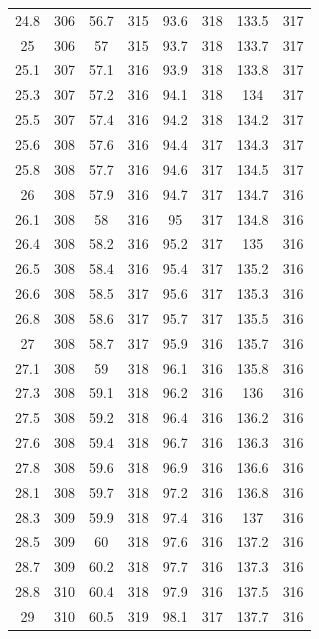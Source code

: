 \documentclass[12pt]{ctexart}
\numberwithin{equation}{section}
\begin{document}
\begin{longtable}{cc|cc|cc|cc}
24.8  &  306  &  56.7  &  315  &  93.6  &  318  &  133.5  &  317  \\
25  &  306  &  57  &  315  &  93.7  &  318  &  133.7  &  317  \\
25.1  &  307  &  57.1  &  316  &  93.9  &  318  &  133.8  &  317  \\
25.3  &  307  &  57.2  &  316  &  94.1  &  318  &  134  &  317  \\
25.5  &  307  &  57.4  &  316  &  94.2  &  318  &  134.2  &  317  \\
25.6  &  308  &  57.6  &  316  &  94.4  &  317  &  134.3  &  317  \\
25.8  &  308  &  57.7  &  316  &  94.6  &  317  &  134.5  &  317  \\
26  &  308  &  57.9  &  316  &  94.7  &  317  &  134.7  &  316  \\
26.1  &  308  &  58  &  316  &  95  &  317  &  134.8  &  316  \\
26.4  &  308  &  58.2  &  316  &  95.2  &  317  &  135  &  316  \\
26.5  &  308  &  58.4  &  316  &  95.4  &  317  &  135.2  &  316  \\
26.6  &  308  &  58.5  &  317  &  95.6  &  317  &  135.3  &  316  \\
26.8  &  308  &  58.6  &  317  &  95.7  &  317  &  135.5  &  316  \\
27  &  308  &  58.7  &  317  &  95.9  &  316  &  135.7  &  316  \\
27.1  &  308  &  59  &  318  &  96.1  &  316  &  135.8  &  316  \\
27.3  &  308  &  59.1  &  318  &  96.2  &  316  &  136  &  316  \\
27.5  &  308  &  59.2  &  318  &  96.4  &  316  &  136.2  &  316  \\
27.6  &  308  &  59.4  &  318  &  96.7  &  316  &  136.3  &  316  \\
27.8  &  308  &  59.6  &  318  &  96.9  &  316  &  136.6  &  316  \\
28.1  &  308  &  59.7  &  318  &  97.2  &  316  &  136.8  &  316  \\
28.3  &  309  &  59.9  &  318  &  97.4  &  316  &  137  &  316  \\
28.5  &  309  &  60  &  318  &  97.6  &  316  &  137.2  &  316  \\
28.7  &  309  &  60.2  &  318  &  97.7  &  316  &  137.3  &  316  \\
28.8  &  310  &  60.4  &  318  &  97.9  &  316  &  137.5  &  316  \\
29  &  310  &  60.5  &  319  &  98.1  &  317  &  137.7  &  316  \\

\end{longtable}
\end{document}
